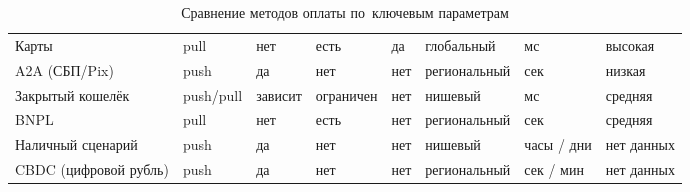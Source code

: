 \begin{table}[H]
  \caption{Сравнение методов оплаты по~ключевым параметрам}\label{tab:payment-methods-matrix}
  \begingroup
  \tablesetup
  \scriptsize
  \setlength{\tabcolsep}{2pt}
  \begin{minipage}{\textwidth}
    \begin{tabularx}{\textwidth}{
        @{}B{0.170\textwidth}
        P{0.075\textwidth}
        P{0.095\textwidth}
        P{0.090\textwidth}
        P{0.085\textwidth}
        P{0.145\textwidth}
        P{0.100\textwidth}
        P{0.155\textwidth}@{}
      }
      \toprule
      \headrow
       &  &  &  &  &  &  &  \\
      \midrule
      Карты &
      pull &
      нет &
      есть &
      да &
      глобальный &
      мс &
      высокая \\
      \rowsep
      A2A (СБП/Pix) &
      push &
      да &
      нет &
      нет &
      региональный &
      сек &
      низкая \\
      \rowsep
      Закрытый кошелёк &
      push/pull &
      зависит &
      ограничен &
      нет &
      нишевый &
      мс &
      средняя \\
      \rowsep
      BNPL &
      pull &
      нет &
      есть &
      нет &
      региональный &
      сек &
      средняя \\
      \rowsep
      Наличный сценарий &
      push &
      да &
      нет &
      нет &
      нишевый &
      часы / дни &
      нет данных \\
      \rowsep
      CBDC (цифровой рубль) &
      push &
      да &
      нет &
      нет &
      региональный &
      сек / мин &
      нет данных \\

\end{tabularx}
\end{minipage}
\end{table}
